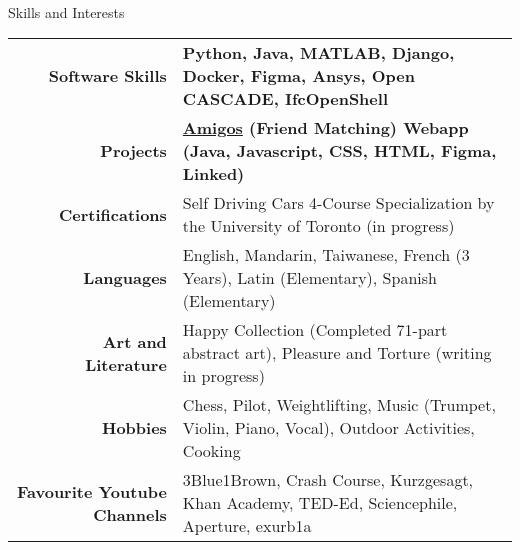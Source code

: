 \documentclass[UTF8]{resume} %
\begin{document}
~\vspace{-0.25cm}
\begin{rSection}{Skills and Interests}

\begin{tabular}{ @{} >{\bfseries}r @{\hspace{5ex}} l }
Software Skills & \textbf{Python, Java, MATLAB, Django, Docker, Figma, Ansys, Open CASCADE, IfcOpenShell}\\ %
Projects & \textbf{\href{https://github.com/CSC207-UofT/course-project-super-turtle-hackers}{Amigos} (Friend Matching) Webapp (Java, Javascript, CSS, HTML, Figma, Linked)}\\
Certifications & Self Driving Cars 4-Course Specialization by the University of Toronto (in progress)\\
Languages & English, Mandarin, Taiwanese, French (3 Years), Latin (Elementary), Spanish (Elementary) \\
Art and Literature & Happy Collection (Completed 71-part abstract art), Pleasure and Torture (writing in progress) \\
Hobbies & Chess, Pilot, Weightlifting, Music (Trumpet, Violin, Piano, Vocal), Outdoor Activities, Cooking\\
Favourite Youtube Channels & 3Blue1Brown, Crash Course, Kurzgesagt, Khan Academy, TED-Ed, Sciencephile, Aperture, exurb1a
\end{tabular}

\end{rSection}
~\vspace{-0.2cm}
\end{document}
